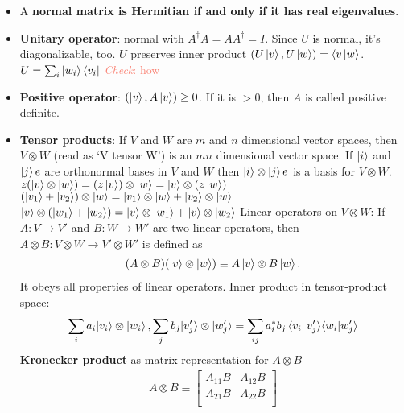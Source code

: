 \documentclass[11pt]{article}
\newcommand{\q}[1]{\textcolor{Salmon}{\emph{Check}: {#1}}}
\begin{document}
\begin{multicols}{3}
\begin{itemize}
        \item A \textbf{normal matrix is Hermitian if and only if it has real eigenvalues}.

        \item \textbf{Unitary operator}: normal with $A^\dagger A = A A^\dagger=I$. Since $U$ is normal, it's diagonalizable, too.
              \subitem $U$ preserves inner product $(U\ket{v}, U\ket{w}) = \langle v\ket{w}$.
              \subitem $U = \sum_i \ket{w_i}\bra{v_i}$ \q{how}

        \item \textbf{Positive operator}: $(\ket{v},A\ket{v})\geq 0$. If it is $>0$, then $A$ is called positive definite.

        \item \textbf{Tensor products}: If $V$ and $W$ are $m$ and $n$ dimensional vector spaces, then $V\otimes W$ (read as `V tensor W') is an $mn$ dimensional vector space.
              \subitem If $\ket{i}$ and $\ket{j}e$ are orthonormal bases in $V$ and $W$ then $\ket{i}\otimes \ket{j}e$ is a basis for $V\otimes W$.
              \subitem $z(\ket{v}\otimes\ket{w})=(z\ket{v})\otimes\ket{w}=\ket{v}\otimes(z\ket{w})$
              \subitem $(|v_1\rangle+|v_2\rangle)\otimes\ket{w}=|v_1\rangle\otimes\ket{w}+|v_2\rangle\otimes\ket{w}$
              \subitem $\ket{v}\otimes(|w_1\rangle+|w_2\rangle) = \ket{v}\otimes|w_1\rangle + \ket{v}\otimes|w_2\rangle$
              \subitem Linear operators on $V\otimes W$: If $A:V\rightarrow V'$ and $B:W\rightarrow W'$ are two linear operators, then $A\otimes B: V\otimes W\rightarrow V'\otimes W'$ is defined as
              \begin{align}
                  (A\otimes B)(\ket{v}\otimes\ket{w})\equiv A\ket{v} \otimes B\ket{w}.
              \end{align}
              It obeys all properties of linear operators.
              \subitem Inner product in tensor-product space:
              \begin{align}
                  \sum_i a_i |v_i\rangle \otimes \ket{w_i}, \sum_j b_j |v_j'\rangle \otimes |w_j'\rangle = \sum_{ij}a_i^*b_j\bra{v_i}v_j'\rangle \langle w_i|w_j'\rangle
              \end{align}
              \subitem \textbf{Kronecker product} as matrix representation for $A\otimes B$
              \begin{align} A\otimes B \equiv
                  \begin{bmatrix}
                      A_{11}B & A_{12}B \\
                      A_{21}B & A_{22}B \\
                  \end{bmatrix}
              \end{align}


\end{itemize}
\end{multicols}
\end{document}
